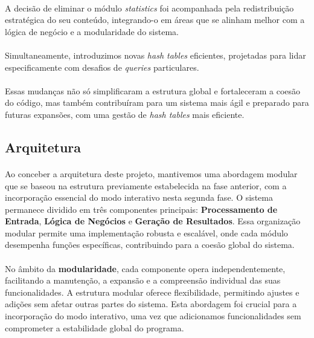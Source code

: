 \documentclass{article}
\begin{document}
\paragraph{}A decisão de eliminar o módulo \textit{statistics} foi acompanhada pela redistribuição estratégica do seu conteúdo, integrando-o em áreas que se alinham melhor com a lógica de negócio e a modularidade do sistema. 
\vspace{-0.3cm}
\paragraph{}Simultaneamente, introduzimos novas \textit{hash tables} eficientes, projetadas para lidar especificamente com desafios de \textit{queries} particulares. 
\vspace{-0.3cm}
\paragraph{}Essas mudanças não só simplificaram a estrutura global e fortaleceram a coesão do código, mas também contribuíram para um sistema mais ágil e preparado para futuras expansões, com uma gestão de \textit{hash tables} mais eficiente.
\subsection{Arquitetura}
\paragraph{}Ao conceber a arquitetura deste projeto, mantivemos uma abordagem modular que se baseou na estrutura previamente estabelecida na fase anterior, com a incorporação essencial do modo interativo nesta segunda fase. O sistema permanece dividido em três componentes principais: \textbf{Processamento de Entrada}, \textbf{Lógica de Negócios} e \textbf{Geração de Resultados}. Essa organização modular permite uma implementação robusta e escalável, onde cada módulo desempenha funções específicas, contribuindo para a coesão global do sistema.
\vspace{-0.3cm}
\paragraph{}No âmbito da \textbf{modularidade}, cada componente opera independentemente, facilitando a manutenção, a expansão e a compreensão individual das suas funcionalidades. A estrutura modular oferece flexibilidade, permitindo ajustes e adições sem afetar outras partes do sistema. Esta abordagem foi crucial para a incorporação do modo interativo, uma vez que adicionamos funcionalidades sem comprometer a estabilidade global do programa.
\vspace{-0.3cm}
\end{document}
